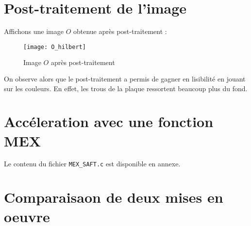 \documentclass[12pt,a4paper,titlepage]{article}
\begin{document}
\section{Post-traitement de l'image}

Affichons une image $O$ obtenue après post-traitement :

            \begin{figure}[H]
                \caption{Image $O$ après post-traitement}
                \texttt{[image: O\_hilbert]}
                \centering
            \end{figure}

On observe alors que le post-traitement a permis de gagner en
lisibilité en jouant sur les couleurs.
En effet, les trous de la plaque ressortent beaucoup plus du fond.

\section{Accéleration avec une fonction MEX}

Le contenu du fichier \texttt{MEX\_SAFT.c} est disponible en annexe.

\section{Comparaisaon de deux mises en oeuvre}
\end{document}
